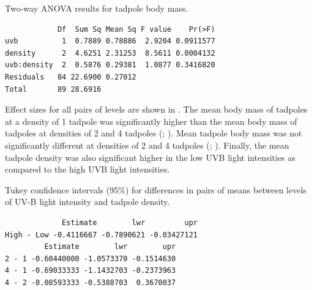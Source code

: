 \documentclass[10pt,openany]{book}\usepackage[]{graphicx}\usepackage[]{color}
\makeatletter
\newenvironment{kframe}{%
 \def\at@end@of@kframe{}%
 \ifinner\ifhmode%
  \def\at@end@of@kframe{\end{minipage}}%
  \begin{minipage}{\columnwidth}%
 \fi\fi%
 \def\FrameCommand##1{\hskip\@totalleftmargin \hskip-\fboxsep
 \colorbox{shadecolor}{##1}\hskip-\fboxsep
     \hskip-\linewidth \hskip-\@totalleftmargin \hskip\columnwidth}%
 \MakeFramed {\advance\hsize-\width
   \@totalleftmargin\z@ \linewidth\hsize
   \@setminipage}}%
 {\par\unskip\endMakeFramed%
 \at@end@of@kframe}
\newenvironment{knitrout}{}{} %
\makeatother
\begin{document}
\begin{table}[h]
  \centering
  \caption{Two-way ANOVA results for tadpole body mass.}\label{tab:TWATadpoleANOVA}
\begin{knitrout}
\color{fgcolor}\begin{kframe}
\begin{verbatim}
            Df  Sum Sq Mean Sq F value    Pr(>F)
uvb          1  0.7889 0.78886  2.9204 0.0911577
density      2  4.6251 2.31253  8.5611 0.0004132
uvb:density  2  0.5876 0.29381  1.0877 0.3416820
Residuals   84 22.6900 0.27012                  
Total       89 28.6916                          
\end{verbatim}
\end{kframe}
\end{knitrout}
\end{table}

Effect sizes for all pairs of levels are shown in .  The mean body mass of tadpoles at a density of 1 tadpole was significantly higher than the mean body mass of tadpoles at densities of 2 and 4 tadpoles (; ).  Mean tadpole body mass was not significantly different at densities of 2 and 4 tadpoles (; ).  Finally, the mean tadpole density was also significant higher in the low UVB light intensities as compared to the high UVB light intensities.

\begin{table}[h]
  \centering
  \caption{Tukey confidence intervals (95\%) for differences in pairs of means between levels of UV-B light intensity and tadpole density.}\label{tab:TWATadpoleTukey}
\begin{knitrout}
\color{fgcolor}\begin{kframe}
\begin{verbatim}
             Estimate        lwr         upr
High - Low -0.4116667 -0.7890621 -0.03427121
         Estimate        lwr        upr
2 - 1 -0.60440000 -1.0573370 -0.1514630
4 - 1 -0.69033333 -1.1432703 -0.2373963
4 - 2 -0.08593333 -0.5388703  0.3670037
\end{verbatim}
\end{kframe}
\end{knitrout}
\end{table}
\end{document}
